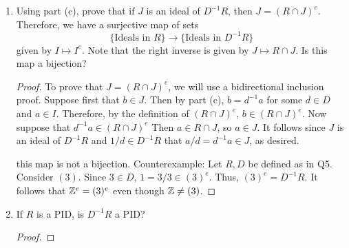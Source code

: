 \documentclass[../psets.tex]{subfiles}
\begin{document}
\begin{enumerate}
\begin{enumerate}[label={(\alph*)}]
\begin{proof}
            \begin{equation*}
                \frac{x}{s}\cdot\frac{a}{b} = \frac{xa}{sb} \in I^e
            \end{equation*}
            as desired.
        \end{proof}
        \item Using part (c), prove that if $J$ is an ideal of $D^{-1}R$, then $J=(R\cap J)^e$. Therefore, we have a surjective map of sets
        \begin{equation*}
            \{\text{Ideals in }R\} \to \{\text{Ideals in }D^{-1}R\}
        \end{equation*}
        given by $I\mapsto I^e$. Note that the right inverse is given by $J\mapsto R\cap J$. Is this map a bijection?
        \begin{proof}
            To prove that $J=(R\cap J)^e$, we will use a bidirectional inclusion proof. Suppose first that $b\in J$. Then by part (c), $b=d^{-1}a$ for some $d\in D$ and $a\in I$. Therefore, by the definition of $(R\cap J)^e$, $b\in(R\cap J)^e$. Now suppose that $d^{-1}a\in(R\cap J)^e$ Then $a\in R\cap J$, so $a\in J$. It follows since $J$ is an ideal of $D^{-1}R$ and $1/d\in D^{-1}R$ that $a/d=d^{-1}a\in J$, as desired.\par
             this map is not a bijection. Counterexample: Let $R,D$ be defined as in Q5. Consider $(3)$. Since $3\in D$, $1=3/3\in(3)^e$. Thus, $(3)^e=D^{-1}R$. It follows that $\mathbb{Z}^e=(3)^e$ even though $\mathbb{Z}\neq(3)$.
        \end{proof}
        \item If $R$ is a PID, is $D^{-1}R$ a PID?
        \begin{proof}


\end{proof}
\end{enumerate}
\end{enumerate}
\end{document}
